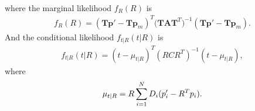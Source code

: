 \begin{theorem}
\begin{align}
	\end{align}
	where the marginal likelihood $f_R(R)$ is
	\begin{align} \label{eqn:VIO-likelihood-marginal}
		f_R(R) = (\mathbf{T}\bm{p}'-\mathbf{T}\bm{p}_m)^T \big(\mathbf{T}\mathbf{A}\mathbf{T}^T\big)^{-1} (\mathbf{T}\bm{p}'-\mathbf{T}\bm{p}_m).
	\end{align}
	And the conditional likelihood $f_{t|R}(t|R)$ is
	\begin{align} \label{eqn:VIO-likelihood-conditional}
		f_{t|R}(t|R) = (t - \mu_{t|R})^T (RCR^T)^{-1} (t - \mu_{t|R}),
	\end{align}
	where
	\begin{align} \label{eqn:VIO-likelihood-mu_{t|R}}
		\mu_{t|R} = R \sum_{i=1}^N D_i(p'_i-R^Tp_i).
	\end{align}
\end{theorem}
